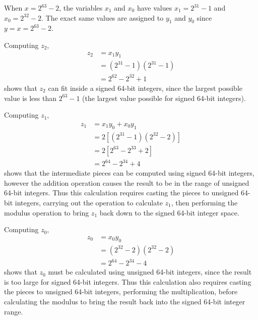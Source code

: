 When $x = 2^{63} - 2$, the variables $x_1$ and $x_0$ have values $x_1 = 2^{31} - 1$ and $x_0 = 2^{32} - 2$. The exact same values are assigned to $y_1$ and $y_0$ since $y = x = 2^{63} - 2$. 

Computing $z_2$,
\begin{equation}
\begin{split}
z_2 & = x_1 y_1\\
 & = (2^{31} - 1) (2^{31} - 1)\\
 & = 2^{62} - 2^{32} + 1
\end{split}
\end{equation}
shows that $z_2$ can fit inside a signed 64-bit integers, since the largest possible value is less than $2^{63} - 1$ (the largest value possible for signed 64-bit integers). 

Computing $z_1$,
\begin{equation}
\begin{split}
z_1 & = x_1 y_0 + x_0 y_1\\
 & = 2[(2^{31} - 1) (2^{32} - 2)]\\
 & = 2[2^{63} - 2^{33} + 2]\\
 & = 2^{64} - 2^{34} + 4
\end{split}
\end{equation}
shows that the intermediate pieces can be computed using signed 64-bit integers, however the addition operation causes the result to be in the range of unsigned 64-bit integers. Thus this calculation requires casting the pieces to unsigned 64-bit integers, carrying out the operation to calculate $z_1$, then performing the modulus operation to bring $z_1$ back down to the signed 64-bit integer space.

Computing $z_0$,
\begin{equation}
\begin{split}
z_0 & = x_0 y_0\\
 & = (2^{32} - 2) (2^{32} - 2)\\
 & = 2^{64} - 2^{34} - 4
\end{split}
\end{equation}
shows that $z_0$ must be calculated using unsigned 64-bit integers, since the result is too large for signed 64-bit integers. Thus this calculation also requires casting the pieces to unsigned 64-bit integers, performing the multiplication, before calculating the modulus to bring the result back into the signed 64-bit integer range.

